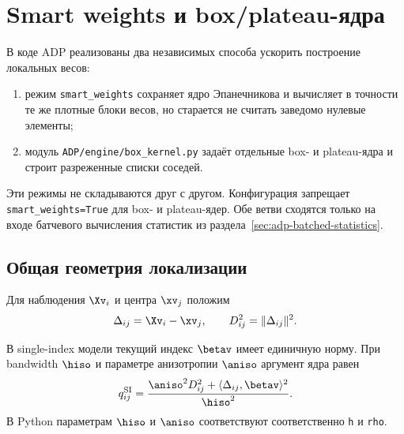 
\section{Smart weights и box/plateau-ядра}
\label{sec:smart-weights-box-kernel}

В коде ADP реализованы два независимых способа ускорить построение
локальных весов:
\begin{enumerate}
\item режим \texttt{smart\_weights} сохраняет ядро Эпанечникова и
      вычисляет в точности те же плотные блоки весов, но старается не
      считать заведомо нулевые элементы;
\item модуль \texttt{ADP/engine/box\_kernel.py} задаёт отдельные
      box- и plateau-ядра и строит разреженные списки соседей.
\end{enumerate}
Эти режимы не складываются друг с другом. Конфигурация запрещает
\texttt{smart\_weights=True} для box- и plateau-ядер. Обе ветви
сходятся только на входе батчевого вычисления статистик из
раздела~\ref{sec:adp-batched-statistics}.

\subsection{Общая геометрия локализации}

Для наблюдения $\Xv_i$ и центра $\xv_j$ положим
\begin{equation}
    \Delta_{ij}=\Xv_i-\xv_j,
    \qquad
    D_{ij}^2=\|\Delta_{ij}\|^2.
\label{eq:smart-delta-distance}
\end{equation}

В single-index модели текущий индекс $\betav$ имеет единичную норму.
При bandwidth $\hiso$ и параметре анизотропии $\aniso$ аргумент ядра
равен
\begin{equation}
    q_{ij}^{\mathrm{SI}}
    =
    \frac{
        \aniso^2D_{ij}^2
        +\langle\Delta_{ij},\betav\rangle^2
    }{\hiso^2}.
\label{eq:smart-single-q}
\end{equation}
В Python параметрам $\hiso$ и $\aniso$ соответствуют соответственно
\texttt{h} и \texttt{rho}.

